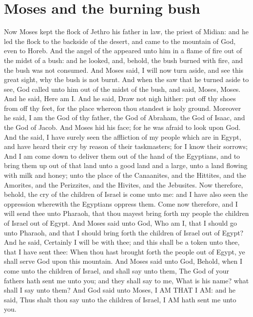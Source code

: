 \section*{Moses and the burning bush}
\begin{biblechapter} %
\verse Now Moses kept the flock of Jethro his father in law, the priest of Midian: and he led the flock to the backside of the desert, and came to the mountain of God, even to Horeb.
\verse And the angel of the \LORD appeared unto him in a flame of fire out of the midst of a bush: and he looked, and, behold, the bush burned with fire, and the bush was not consumed.
\verse And Moses said, I will now turn aside, and see this great sight, why the bush is not burnt.
\verse And when the \LORD saw that he turned aside to see, God called unto him out of the midst of the bush, and said, Moses, Moses. And he said, Here am I.
\verse And he said, Draw not nigh hither: put off thy shoes from off thy feet, for the place whereon thou standest is holy ground.
\verse Moreover he said, I am the God of thy father, the God of Abraham, the God of Isaac, and the God of Jacob. And Moses hid his face; for he was afraid to look upon God.
\verse And the \LORD said, I have surely seen the affliction of my people which are in Egypt, and have heard their cry by reason of their taskmasters; for I know their sorrows;
\verse And I am come down to deliver them out of the hand of the Egyptians, and to bring them up out of that land unto a good land and a large, unto a land flowing with milk and honey; unto the place of the Canaanites, and the Hittites, and the Amorites, and the Perizzites, and the Hivites, and the Jebusites.
\verse Now therefore, behold, the cry of the children of Israel is come unto me: and I have also seen the oppression wherewith the Egyptians oppress them.
\verse Come now therefore, and I will send thee unto Pharaoh, that thou mayest bring forth my people the children of Israel out of Egypt.
\verse And Moses said unto God, Who am I, that I should go unto Pharaoh, and that I should bring forth the children of Israel out of Egypt?
\verse And he said, Certainly I will be with thee; and this shall be a token unto thee, that I have sent thee: When thou hast brought forth the people out of Egypt, ye shall serve God upon this mountain.
\verse And Moses said unto God, Behold, when I come unto the children of Israel, and shall say unto them, The God of your fathers hath sent me unto you; and they shall say to me, What is his name? what shall I say unto them?
\verse And God said unto Moses, I AM THAT I AM: and he said, Thus shalt thou say unto the children of Israel, I AM hath sent me unto you.

\end{biblechapter}
